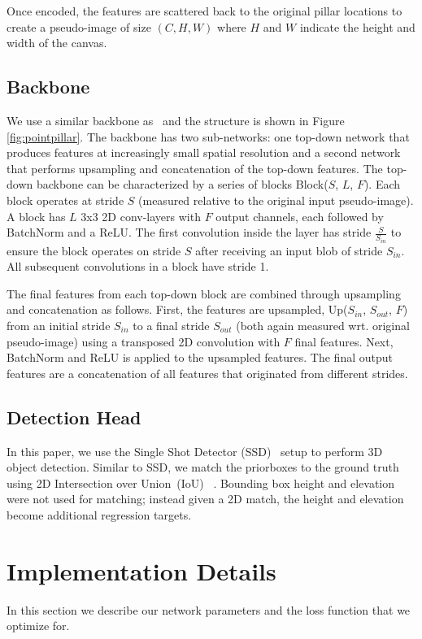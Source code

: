 \documentclass[10pt,twocolumn,letterpaper]{article}
\newcommand{\squeeze}{\vspace{-0.5mm}}
\begin{document}
\label{sec:stacked-to-pseudo}
Once encoded, the features are scattered back to the original pillar locations to create a pseudo-image of size $(C, H, W)$ where $H$ and $W$ indicate the height and width of the canvas.

\squeeze
\subsection{Backbone}
\squeeze
We use a similar backbone as~\cite{voxelnet} and the structure is shown in Figure \ref{fig:pointpillar}.
The backbone has two sub-networks:
one top-down network that produces features at increasingly small spatial resolution and a second network that performs upsampling and concatenation of the top-down features.
The top-down backbone can be characterized by a series of blocks Block($S$, $L$, $F$).
Each block operates at stride $S$ (measured relative to the original input pseudo-image).
A block has $L$ 3x3 2D conv-layers with $F$ output channels, each followed by BatchNorm and a ReLU.
The first convolution inside the layer has stride $\frac{S}{S_{in}}$ to ensure the block operates on stride $S$ after receiving an input blob of stride $S_{in}$.
All subsequent convolutions in a block have stride 1.

The final features from each top-down block are combined through upsampling and concatenation as follows.
First, the features are upsampled, Up($S_{in}$, $S_{out}$, $F$) from an initial stride $S_{in}$ to a final stride $S_{out}$ (both again measured wrt. original pseudo-image) using a transposed 2D convolution with $F$ final features.
Next, BatchNorm and ReLU is applied to the upsampled features.
The final output features are a concatenation of all features that originated from different strides.

\squeeze
\subsection{Detection Head}
\squeeze
In this paper, we use the Single Shot Detector (SSD)~\cite{ssd} setup to perform 3D object detection.
Similar to SSD, we match the priorboxes to the ground truth using 2D Intersection over Union~(IoU) ~\cite{pascal}.
Bounding box height and elevation were not used for matching; instead given a 2D match, the height and elevation become additional regression targets.

 


\section{Implementation Details} \label{sec:training}
\squeeze
In this section we describe our network parameters and the loss function that we optimize for.
\end{document}
